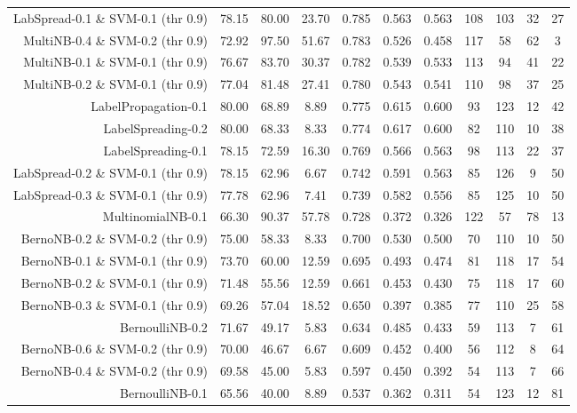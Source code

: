 \begin{table}[!htb]
\begin{tabular}{r|c|c|c|c|c|c|c|c|c|c}
LabSpread-0.1 \& SVM-0.1 (thr 0.9) & 78.15 & 80.00 & 23.70 & 0.785 & 0.563 & 0.563 & 108 & 103 & 32 & 27 \\ 
MultiNB-0.4 \& SVM-0.2 (thr 0.9) & 72.92 & 97.50 & 51.67 & 0.783 & 0.526 & 0.458 & 117 & 58 & 62 & 3 \\ 
MultiNB-0.1 \& SVM-0.1 (thr 0.9) & 76.67 & 83.70 & 30.37 & 0.782 & 0.539 & 0.533 & 113 & 94 & 41 & 22 \\ 
MultiNB-0.2 \& SVM-0.1 (thr 0.9) & 77.04 & 81.48 & 27.41 & 0.780 & 0.543 & 0.541 & 110 & 98 & 37 & 25 \\ 
LabelPropagation-0.1 & 80.00 & 68.89 & 8.89 & 0.775 & 0.615 & 0.600 & 93 & 123 & 12 & 42 \\ 
LabelSpreading-0.2 & 80.00 & 68.33 & 8.33 & 0.774 & 0.617 & 0.600 & 82 & 110 & 10 & 38 \\ 
LabelSpreading-0.1 & 78.15 & 72.59 & 16.30 & 0.769 & 0.566 & 0.563 & 98 & 113 & 22 & 37 \\ 
LabSpread-0.2 \& SVM-0.1 (thr 0.9) & 78.15 & 62.96 & 6.67 & 0.742 & 0.591 & 0.563 & 85 & 126 & 9 & 50 \\ 
LabSpread-0.3 \& SVM-0.1 (thr 0.9) & 77.78 & 62.96 & 7.41 & 0.739 & 0.582 & 0.556 & 85 & 125 & 10 & 50 \\ 
MultinomialNB-0.1 & 66.30 & 90.37 & 57.78 & 0.728 & 0.372 & 0.326 & 122 & 57 & 78 & 13 \\ 
BernoNB-0.2 \& SVM-0.2 (thr 0.9) & 75.00 & 58.33 & 8.33 & 0.700 & 0.530 & 0.500 & 70 & 110 & 10 & 50 \\ 
BernoNB-0.1 \& SVM-0.1 (thr 0.9) & 73.70 & 60.00 & 12.59 & 0.695 & 0.493 & 0.474 & 81 & 118 & 17 & 54 \\ 
BernoNB-0.2 \& SVM-0.1 (thr 0.9) & 71.48 & 55.56 & 12.59 & 0.661 & 0.453 & 0.430 & 75 & 118 & 17 & 60 \\ 
BernoNB-0.3 \& SVM-0.1 (thr 0.9) & 69.26 & 57.04 & 18.52 & 0.650 & 0.397 & 0.385 & 77 & 110 & 25 & 58 \\ 
BernoulliNB-0.2 & 71.67 & 49.17 & 5.83 & 0.634 & 0.485 & 0.433 & 59 & 113 & 7 & 61 \\ 
BernoNB-0.6 \& SVM-0.2 (thr 0.9) & 70.00 & 46.67 & 6.67 & 0.609 & 0.452 & 0.400 & 56 & 112 & 8 & 64 \\ 
BernoNB-0.4 \& SVM-0.2 (thr 0.9) & 69.58 & 45.00 & 5.83 & 0.597 & 0.450 & 0.392 & 54 & 113 & 7 & 66 \\ 
BernoulliNB-0.1 & 65.56 & 40.00 & 8.89 & 0.537 & 0.362 & 0.311 & 54 & 123 & 12 & 81 \\ 
\hline\hline
\end{tabular}
\end{table}
